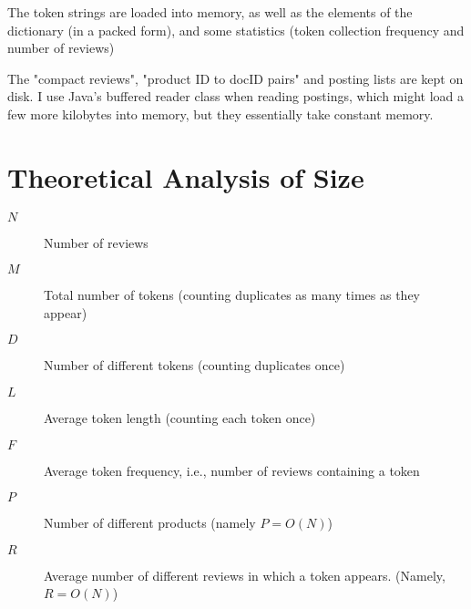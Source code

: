 \documentclass[11pt]{article}
\begin{document}
\begin{comment}
{\em Put an explanation of which portions of the index are read into memory when an IndexReader object is created, and which portions will be read as needed. }
\end{comment}

The token strings are loaded into memory, as well as the elements of the dictionary (in a packed form), and some statistics (token collection frequency
and number of reviews)

The "compact reviews", "product ID to docID pairs" and posting lists are kept on disk. I use Java's buffered reader class when reading postings, which
might load a few more kilobytes into memory, but they essentially take constant memory.

\section{Theoretical Analysis of Size}

\begin{comment}
{\em Theoretically analyze the expected size (in bytes) of all of your index structures. In your
  analysis, the size of the index should be a function of the size of the
  input.  Use the following variables to denote the various input size parameters:
}
\end{comment}
  \begin{description}
      \item[$N$] Number of reviews
      \item[$M$] Total number of tokens (counting duplicates as many times as they appear)
      \item[$D$] Number of different tokens (counting duplicates once)
      \item[$L$] Average token length (counting each token once)
      \item[$F$] Average token frequency, i.e., number of reviews containing a token
      \item[$P$] Number of different products (namely $P = O(N)$)
      \item[$R$] Average number of different reviews in which a token appears. (Namely, $R = O(N)$)
  \end{description}
\end{document}
